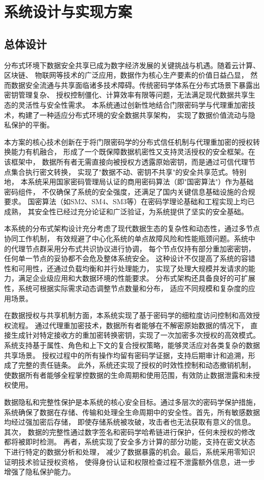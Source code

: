 \chapter{系统设计与实现方案}
\section{总体设计}
分布式环境下数据安全共享已成为数字经济发展的关键挑战与机遇。随着云计算、区块链、
物联网等技术的广泛应用，数据作为核心生产要素的价值日益凸显，
然而数据安全流通与共享面临诸多技术障碍。传统密码学体系在分布式场景下暴露出密钥管理复杂、
授权控制僵化、计算效率有限等问题，无法满足现代数据共享生态的灵活性与安全性需求。
本系统通过创新性地结合门限密码学与代理重加密技术，构建了一种适应分布式环境的安全数据共享架构，
实现了数据价值流动与隐私保护的平衡。

本方案的核心技术创新在于将门限密码学的分布式信任机制与代理重加密的授权转换能力有机融合，
形成了一个既保障数据机密性又支持灵活授权的安全框架。在该框架中，
数据所有者无需直接向被授权方透露原始密钥，而是通过可信代理节点集合执行密文转换，
实现了"数据不动、密钥不共享"的安全共享范式。特别地，
本系统采用国家密码管理局认证的商用密码算法（即"国密算法"）作为基础密码组件，
不仅确保了系统的安全强度，还满足了国内关键信息基础设施的合规要求。
国密算法（如SM2、SM4、SM3等）在密码学理论基础和工程实现上均已成熟，
其安全性已经过充分论证和广泛验证，为系统提供了坚实的安全基础。

本系统的分布式架构设计充分考虑了现代数据生态的复杂性和动态性，通过多节点协同工作机制，
有效规避了中心化系统的单点故障风险和性能瓶颈问题。系统中的代理节点群采用分布式共识协议进行协调，
每个节点仅持有部分重加密密钥，任何单一节点的妥协都不会危及整体系统安全。
这种设计不仅提高了系统的容错性和可用性，还通过负载均衡和并行处理能力，
实现了处理大规模并发请求的能力，满足企业级应用和大数据环境的性能要求。
分布式架构还具备良好的可扩展性，系统可根据实际需求动态调整节点数量和分布，
适应不同规模和复杂度的应用场景。

在数据授权与共享机制方面，本系统实现了基于密码学的细粒度访问控制和高效授权流程。
通过代理重加密技术，数据所有者能够在不解密原始数据的情况下，
直接生成针对特定接收方的重加密转换密钥，实现了一次加密多次授权的高效模式。
系统支持基于属性、角色和上下文的复合授权策略，能够灵活应对各类复杂的数据共享场景。
授权过程中的所有操作均留有密码学证据，支持后期审计和追溯，形成了完整的责任链条。
此外，系统还实现了授权的时效性控制和动态撤销机制，
使数据所有者能够全程掌控数据的生命周期和使用范围，有效防止数据泄露和未授权使用。

数据隐私和完整性保护是本系统的核心安全目标。通过多层次的密码学保护措施，
系统确保了数据在存储、传输和处理全生命周期中的安全性。首先，所有敏感数据均经过强加密后存储，
即使存储系统被攻破，攻击者也无法获取有意义的信息。其次，
数据的完整性通过数字签名和密码学哈希链进行保护，任何未授权的修改都将被即时检测。
再者，系统实现了安全多方计算的部分功能，支持在密文状态下进行特定的数据分析和处理，
减少了数据暴露的机会。最后，系统采用零知识证明技术验证授权资格，
使得身份认证和权限检查过程不泄露额外信息，进一步增强了隐私保护能力。

